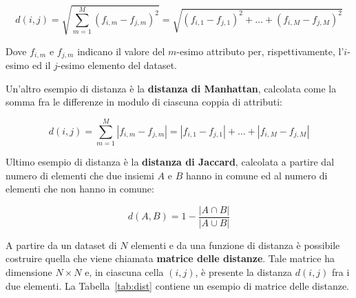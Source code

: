 \documentclass[a4paper, 12pt]{report}
\begin{document}
			\begin{equation}
				d(i, j) =
				\sqrt{\sum_{m = 1}^{M} (f_{i, m} - f_{j, m})^{2}} =
				\sqrt{(f_{i, 1} - f_{j, 1})^{2} + \dots +
					(f_{i, M} - f_{j, M})^{2}}
			\end{equation}

			Dove $f_{i, m}$ e $f_{j, m}$ indicano il valore del $m$-esimo
			attributo per, rispettivamente, l'$i$-esimo ed il $j$-esimo
			elemento del dataset.

			Un'altro esempio di distanza è la \textbf{distanza di Manhattan},
			calcolata come la somma fra le differenze in modulo di ciascuna
			coppia di attributi:

			\begin{equation}
				d(i, j) =
				\sum_{m = 1}^{M} |f_{i, m} - f_{j, m}| =
				|f_{i, 1} - f_{j, 1}| + \dots +
				|f_{i, M} - f_{j, M}|
			\end{equation}

			Ultimo esempio di distanza è la \textbf{distanza di Jaccard},
			calcolata a partire dal numero di elementi che due insiemi $A$
			e $B$ hanno in comune ed al numero di elementi che non hanno
			in comune:

			\begin{equation}
				d(A, B) = 1 - \frac{|A \cap B|}{|A \cup B|}
			\end{equation}

			A partire da un dataset di $N$ elementi e da una funzione
			di distanza è possibile costruire quella che viene chiamata
			\textbf{matrice delle distanze}. Tale matrice ha dimensione
			$N \times N$ e, in ciascuna cella $(i, j)$, è presente la
			distanza $d(i, j)$ fra i due elementi. La Tabella~\ref{tab:dist}
			contiene un esempio di matrice delle distanze.
\end{document}

